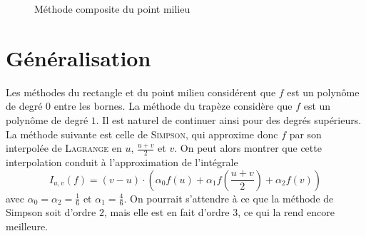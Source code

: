 \begin{figure}[h!]
    \centering

    \caption{Méthode composite du point milieu}
    \label{fig:trapeze-composite-method}
\end{figure}


\section{Généralisation}

Les méthodes du rectangle et du point milieu considérent que $ f $ est un polynôme de degré $ 0 $ entre les bornes. La méthode du trapèze considère que $ f $ est un polynôme de degré $ 1 $. Il est naturel de continuer ainsi pour des degrés supérieurs. La méthode suivante est celle de \textsc{Simpson}, qui approxime donc $ f $ par son interpolée de \textsc{Lagrange} en $ u $, $ \frac{u+v}{2} $ et $ v $. On peut alors montrer que cette interpolation conduit à l'approximation de l'intégrale \[
    \hat{I}_{u, v}(f) = (v-u) \cdot \left(\alpha_0 f(u) + \alpha_1 f(\frac{u+v}{2}) + \alpha_2 f(v)\right)
\]
avec $ \alpha_0=\alpha_2=\frac{1}{6} $ et $ \alpha_1=\frac{4}{6} $. On pourrait s'attendre à ce que la méthode de Simpson soit d'ordre $ 2 $, mais elle est en fait d'ordre $ 3 $, ce qui la rend encore meilleure.

